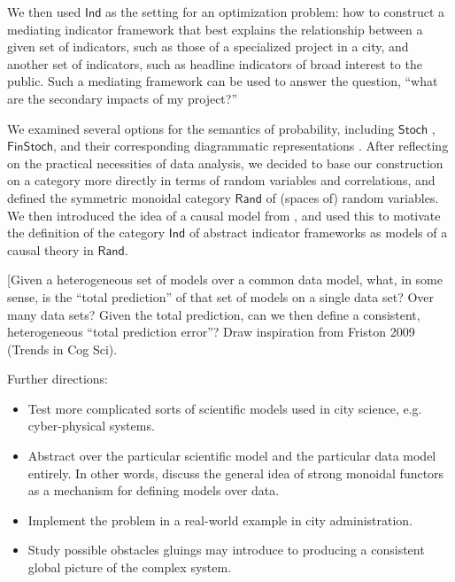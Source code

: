 \documentclass{article}
\theoremstyle{definition}
\newcommand{\redout}[1]{{\color{red}#1}}
\newcommand{\Cat}[1]{\mathsf{#1}}
\def\Ind{\Cat{Ind}}
\def\Rand{\Cat{Rand}}
\def\Stoch{\Cat{Stoch}}
\def\FinStoch{\Cat{FinStoch}}
\begin{document}
We then used $\Ind$ as the setting for an optimization problem: how to construct a mediating indicator framework that best explains the relationship between a given set of indicators, such as those of a specialized project in a city, and another set of indicators, such as headline indicators of broad interest to the public. Such a mediating framework can be used to answer the question, ``what are the secondary impacts of my project?''

We examined several options for the semantics of probability, including $\Stoch$ \cite{lawvere62}, $\FinStoch$, and their corresponding diagrammatic representations \cite{coecke_spekkens}. After reflecting on the practical necessities of data analysis, we decided to base our construction on a category more directly in terms of random variables and correlations, and defined the symmetric monoidal category $\Rand$ of (spaces of) random variables. We then introduced the idea of a causal model from \cite{fong13}, and used this to motivate the definition of the category $\Ind$ of abstract indicator frameworks as models of a causal theory in $\Rand$.

\redout{[Given a heterogeneous set of models over a common data model, what, in some sense, is the ``total prediction'' of that set of models on a single data set? Over many data sets? Given the total prediction, can we then define a consistent, heterogeneous ``total prediction error''? Draw inspiration from Friston 2009 (Trends in Cog Sci).}

Further directions:


\begin{itemize}
\item Test more complicated sorts of scientific models used in city science, e.g. cyber-physical systems.
\item Abstract over the particular scientific model and the particular data model entirely. In other words, discuss the general idea of strong monoidal functors as a mechanism for defining models over data.
\item Implement the problem in a real-world example in city administration.
\item Study possible obstacles gluings may introduce to producing a consistent global picture of the complex system.
\end{itemize}
\end{document}
